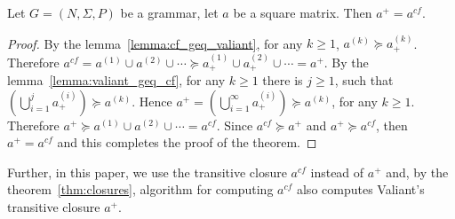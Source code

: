 \begin{mytheorem}\label{thm:closures}
	Let $G =(N,\Sigma,P)$ be a grammar, let $a$ be a square matrix. Then $a^+ = a^{cf}$.
\end{mytheorem}
\begin{proof}
	
	By the lemma~\ref{lemma:cf_geq_valiant}, for any $k \geq 1$, $a^{(k)} \succeq a^{(k)}_+$. Therefore $a^{cf} = a^{(1)} \cup a^{(2)} \cup \cdots \succeq a^{(1)}_+ \cup a^{(2)}_+ \cup \cdots = a^+$. By the lemma~\ref{lemma:valiant_geq_cf}, for any $k \geq 1$ there is $j \geq 1$, such that $(\bigcup^{j}_{i=1}{a^{(i)}_+}) \succeq a^{(k)}$. Hence $a^+ = (\bigcup^{\infty}_{i=1}{a^{(i)}_+}) \succeq a^{(k)}$, for any $k \geq 1$. Therefore $a^+ \succeq a^{(1)} \cup a^{(2)} \cup \cdots = a^{cf}$. Since $a^{cf} \succeq a^+$ and $a^+ \succeq a^{cf}$, then $a^+ = a^{cf}$ and this completes the proof of the theorem.
\end{proof}

Further, in this paper, we use the transitive closure $a^{cf}$ instead of $a^+$ and, by the theorem~\ref{thm:closures}, algorithm for computing $a^{cf}$ also computes Valiant's transitive closure $a^+$.
